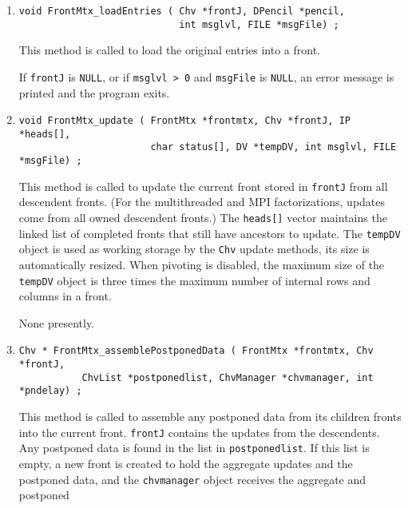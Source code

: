 \begin{enumerate}
\item
\begin{verbatim}
void FrontMtx_loadEntries ( Chv *frontJ, DPencil *pencil, 
                            int msglvl, FILE *msgFile) ;
\end{verbatim}
This method is called to load the original entries into a front.
\par {}
If {\tt frontJ} is {\tt NULL},
or if {\tt msglvl > 0} and {\tt msgFile} is {\tt NULL},
an error message is printed and the program exits.
\item
\begin{verbatim}
void FrontMtx_update ( FrontMtx *frontmtx, Chv *frontJ, IP *heads[], 
                       char status[], DV *tempDV, int msglvl, FILE *msgFile) ;
\end{verbatim}
This method is called to update the current front stored in {\tt frontJ}
from all descendent fronts.
(For the multithreaded and MPI factorizations, updates come from
all owned descendent fronts.)
The {\tt heads[]} vector maintains the linked list of completed 
fronts that still have ancestors to update.
The {\tt tempDV} object is used as working storage by the {\tt Chv}
update methods, its size is automatically resized.
When pivoting is disabled, the maximum size of the {\tt tempDV}
object is three times the maximum number of internal rows and columns
in a front.
\par {}
None presently.
\item
\begin{verbatim}
Chv * FrontMtx_assemblePostponedData ( FrontMtx *frontmtx, Chv *frontJ, 
           ChvList *postponedlist, ChvManager *chvmanager, int *pndelay) ;
\end{verbatim}
This method is called to assemble any postponed data 
from its children fronts into the current front.
{\tt frontJ} contains the updates from the descendents.
Any postponed data is found in the list in {\tt postponedlist}.
If this list is empty, a new front is created to hold the aggregate
updates and the postponed data, and 
the {\tt chvmanager} object receives the aggregate and postponed {\tt
}
\end{enumerate}
